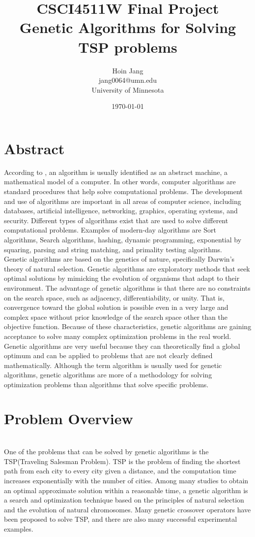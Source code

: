 \documentclass[12pt]{article}
\title{%
    CSCI4511W Final Project\\
    \large Genetic Algorithms for Solving TSP problems}
\author{Hoin Jang \\ jang0064@umn.edu \\ University of Minnesota}
\date{\today}
\begin{document}
\maketitle

\section*{Abstract}

According to \cite{moschovakis2001algorithm}, an algorithm is usually identified as an abstract machine,
a mathematical model of a computer. In other words, computer algorithms are standard procedures that help solve computational problems. The development and use of algorithms are important in all areas of computer science, including databases, artificial intelligence, networking, graphics, operating systems, and security. Different types of algorithms exist that are used to solve different computational problems. Examples of modern-day algorithms are Sort algorithms, Search algorithms, hashing, dynamic programming, exponential by squaring, parsing and string matching, and primality testing algorithms.\\

Genetic algorithms are based on the genetics of nature, specifically Darwin's theory of natural selection. Genetic algorithms are exploratory methods that seek optimal solutions by mimicking the evolution of organisms that adapt to their environment. The advantage of genetic algorithms is that there are no constraints on the search space, such as adjacency, differentiability, or unity. That is, convergence toward the global solution is possible even in a very large and complex space without prior knowledge of the search space other than the objective function. Because of these characteristics, genetic algorithms are gaining acceptance to solve many complex optimization problems in the real world. Genetic algorithms are very useful because they can theoretically find a global optimum and can be applied to problems that are not clearly defined mathematically. Although the term algorithm is usually used for genetic algorithms, genetic algorithms are more of a methodology for solving optimization problems than algorithms that solve specific problems.

\section*{Problem Overview}\\One of the problems that can be solved by genetic algorithms is the TSP(Traveling Salesman Problem). TSP is the problem of finding the shortest path from each city to every city given a distance, and the computation time increases exponentially with the number of cities\cite{razali2011genetic}. Among many studies to obtain an optimal approximate solution within a reasonable time, a genetic algorithm is a search and optimization technique based on the principles of natural selection and the evolution of natural chromosomes. Many genetic crossover operators have been proposed to solve TSP, and there are also many successful experimental examples. \\
\end{document}

